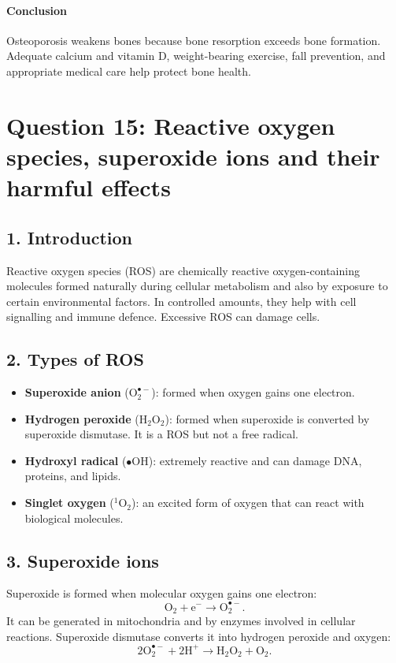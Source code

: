 \documentclass[11pt]{article}
\begin{document}
\paragraph{Conclusion}
Osteoporosis weakens bones because bone resorption exceeds bone formation. Adequate calcium and vitamin D, weight-bearing exercise, fall prevention, and appropriate medical care help protect bone health.

\section*{Question 15: Reactive oxygen species, superoxide ions and their harmful effects}

\subsection*{1. Introduction}
Reactive oxygen species (ROS) are chemically reactive oxygen-containing molecules formed naturally during cellular metabolism and also by exposure to certain environmental factors. In controlled amounts, they help with cell signalling and immune defence. Excessive ROS can damage cells.

\subsection*{2. Types of ROS}
\begin{itemize}
    \item \textbf{Superoxide anion} (\(\mathrm{O_2^{\bullet-}}\)): formed when oxygen gains one electron.
    \item \textbf{Hydrogen peroxide} (\(\mathrm{H_2O_2}\)): formed when superoxide is converted by superoxide dismutase. It is a ROS but not a free radical.
    \item \textbf{Hydroxyl radical} (\(\mathrm{\bullet OH}\)): extremely reactive and can damage DNA, proteins, and lipids.
    \item \textbf{Singlet oxygen} (\(\mathrm{{}^{1}O_2}\)): an excited form of oxygen that can react with biological molecules.
\end{itemize}

\subsection*{3. Superoxide ions}
Superoxide is formed when molecular oxygen gains one electron:
\[
\mathrm{O_2+e^-\longrightarrow O_2^{\bullet-}}.
\]
It can be generated in mitochondria and by enzymes involved in cellular reactions. Superoxide dismutase converts it into hydrogen peroxide and oxygen:
\[
\mathrm{2O_2^{\bullet-}+2H^+\longrightarrow H_2O_2+O_2}.
\]
\end{document}
